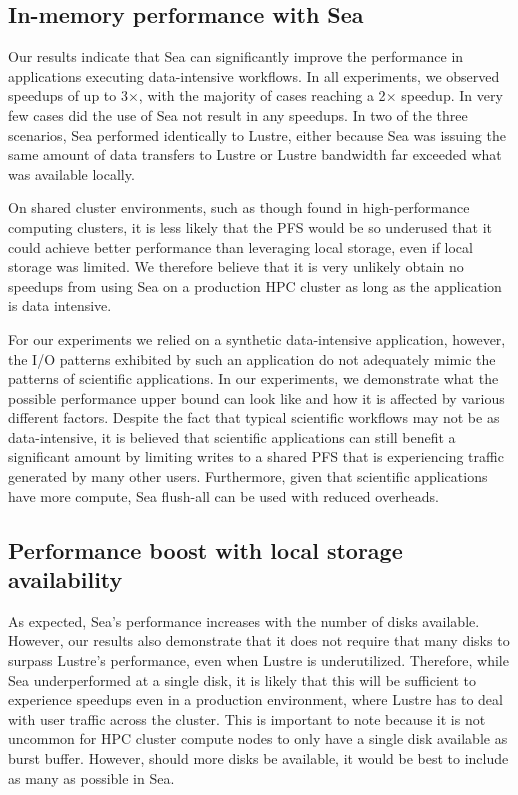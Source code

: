     \subsection{In-memory performance with Sea}
   
    Our results indicate that Sea can significantly improve the performance in
    applications executing data-intensive workflows. In all experiments, we
    observed speedups of up to 3$\times$, with the majority of cases reaching a
    2$\times$ speedup. In very few cases did the use of Sea not result in any
    speedups. In two of the three scenarios, Sea performed identically to
    Lustre, either because Sea was issuing the same amount of data transfers to
    Lustre or Lustre bandwidth far exceeded what was available locally.

    On shared cluster environments, such as though found in high-performance
    computing clusters, it is less likely that the PFS would be so underused
    that it could achieve better performance than leveraging local storage, even
    if local storage was limited. We therefore believe that it is very unlikely
    obtain no speedups from using Sea on a production HPC cluster as long as the
    application is data intensive.
    
    For our experiments we relied on a synthetic data-intensive application,
    however, the I/O patterns exhibited by such an application do not adequately
    mimic the patterns of scientific applications. In our experiments, we
    demonstrate what the possible performance upper bound can look like and how
    it is affected by various different factors. Despite the fact that typical
    scientific workflows may not be as data-intensive, it is believed that
    scientific applications can still benefit a significant amount by limiting
    writes to a shared PFS that is experiencing traffic generated by many other
    users. Furthermore, given that scientific applications have more compute,
    Sea flush-all can be used with reduced overheads.

    \subsection{Performance boost with local storage availability}

    As expected, Sea's performance increases with the number of disks available.
    However, our results also demonstrate that it does not require that many
    disks to surpass Lustre's performance, even when Lustre is underutilized.
    Therefore, while Sea underperformed at a single disk, it is likely that this
    will be sufficient to experience speedups even in a production environment,
    where Lustre has to deal with user traffic across the cluster. This is
    important to note because it is not uncommon for HPC cluster compute nodes
    to only have a single disk available as burst buffer. However, should more
    disks be available, it would be best to include as many as possible in Sea.

